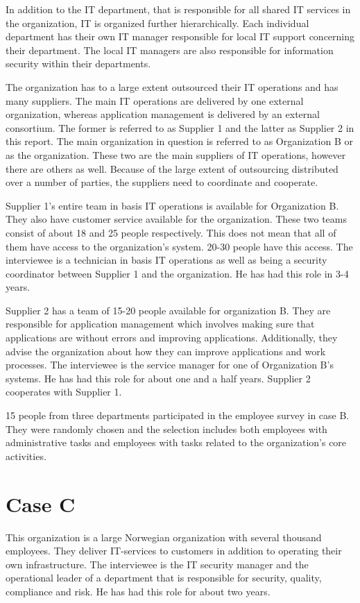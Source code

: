 In addition to the IT department, that is responsible for all shared IT services in the organization, IT is organized further hierarchically. Each individual department has their own IT manager responsible for local IT support concerning their department. The local IT managers are also responsible for information security within their departments.

The organization has to a large extent outsourced their IT operations and has many suppliers. The main IT operations are delivered by one external organization, whereas application management is delivered by an external consortium. The former is referred to as Supplier 1 and the latter as Supplier 2 in this report. The main organization in question is referred to as Organization B or as the organization. These two are the main suppliers of IT operations, however there are others as well. Because of the large extent of outsourcing distributed over a number of parties, the suppliers need to coordinate and cooperate.

Supplier 1's entire team in basis IT operations is available for Organization B. They also have customer service available for the organization. These two teams consist of about 18 and 25 people respectively. This does not mean that all of them have access to the organization's system. 20-30 people have this access. The interviewee is a technician in basis IT operations as well as being a security coordinator between Supplier 1 and the organization. He has had this role in 3-4 years.

Supplier 2 has a team of 15-20 people available for organization B. They are responsible for application management which involves making sure that applications are without errors and improving applications. Additionally, they advise the organization about how they can improve applications and work processes. The interviewee is the service manager for one of Organization B's systems. He has had this role for about one and a half years. Supplier 2 cooperates with Supplier 1.

15 people from three departments participated in the employee survey in case B. They were randomly chosen and the selection includes both employees with administrative tasks and employees with tasks related to the organization's core activities.

\section{Case C}
This organization is a large Norwegian organization with several thousand employees. They deliver IT-services to customers in addition to operating their own infrastructure. The interviewee is the IT security manager  and the operational leader of a department that is responsible for security, quality, compliance and risk. He has had this role for about two years.

